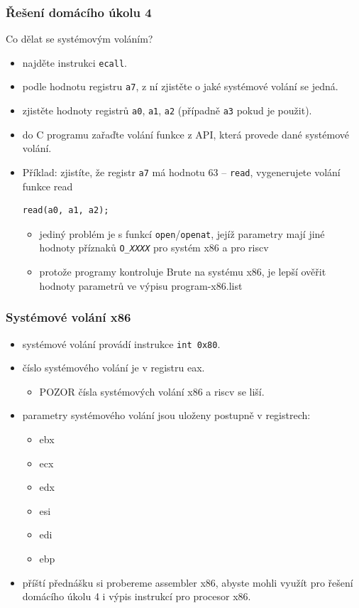 \documentclass{beamer}
\begin{document}
\begin{frame}[fragile]
\frametitle{Řešení domácího úkolu 4}

Co dělat se systémovým voláním?
\begin{itemize}
\item najděte instrukci \texttt{ecall}.
\item podle hodnotu registru \texttt{a7}, z ní zjistěte o jaké systémové volání se jedná.
\item zjistěte hodnoty registrů \texttt{a0}, \texttt{a1}, \texttt{a2} (případně \texttt{a3} pokud je použit).
\item do C programu zařaďte volání funkce z API, která provede dané systémové volání.
\item Příklad: zjistíte, že registr \texttt{a7} má hodnotu 63 -- \texttt{read}, vygenerujete volání funkce read
\begin{verbatim}
read(a0, a1, a2);
\end{verbatim}
\begin{itemize}
 \item jediný problém je s funkcí \texttt{open}/\texttt{openat}, jejíž parametry mají jiné hodnoty příznaků \texttt{O\_\textit{XXXX}} pro systém x86 a pro riscv
 \item protože programy kontroluje Brute na systému x86, je lepší ověřit hodnoty parametrů ve výpisu program-x86.list
 \end{itemize}
\end{itemize}
\end{frame}

\begin{frame}
\frametitle{Systémové volání x86}

\begin{itemize}
\item systémové volání provádí instrukce \texttt{int 0x80}.
\item číslo systémového volání je v registru eax.
 \begin{itemize}
 \item POZOR čísla systémových volání x86 a riscv se liší.
 \end{itemize}
\item parametry systémového volání jsou uloženy postupně v registrech:
 \begin{itemize}
 \item ebx 
 \item ecx 
 \item edx 
 \item esi 
 \item edi 
 \item ebp 
 \end{itemize}
\item příští přednášku si probereme assembler x86, abyste mohli využít pro řešení domácího úkolu 4 i výpis instrukcí pro procesor x86.
\end{itemize}
\end{frame}
\end{document}

